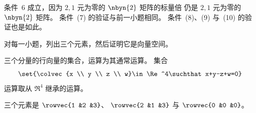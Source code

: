 \begin{exercises}
\begin{answer}
\begin{exparts}
          条件~$6$ 成立，因为 $2,1$ 元为零的 $\nbyn{2}$ 矩阵的标量倍
          仍是 $2,1$ 元为零的 $\nbyn{2}$ 矩阵。
          条件~(7) 的验证与前一小题相同。
          条件~(8)、(9) 与~(10) 的验证也是如此。
      \end{exparts}
    \end{answer}
  \recommended \item
    对每一小题，列出三个元素，然后证明它是向量空间。
    \begin{exparts}
      \partsitem 三个分量的行向量的集合，运算为其通常运算。
      \partsitem 集合
        \begin{equation*}
          \set{\colvec{x \\ y \\ z \\ w}\in\Re^4\suchthat x+y-z+w=0}
        \end{equation*}
        运算取从 $\Re^4$ 继承的运算。
    \end{exparts}
    \begin{answer}
      \begin{exparts}
        \partsitem
          三个元素是 $\rowvec{1  &2  &3}$、
          $\rowvec{2  &1  &3}$ 与 $\rowvec{0  &0  &0}$。


\end{exparts}
\end{answer}
\end{exercises}
